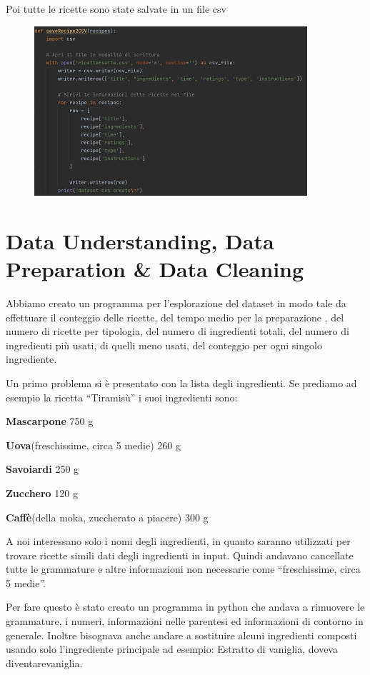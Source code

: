 \documentclass[12pt]{report}
\begin{document}
Poi tutte le ricette sono state salvate in un file csv
    \begin{figure}[H]
        \centering
        {\includegraphics[width=0.9\textwidth]{img/img3.jpg}}
    \end{figure}



\section{Data Understanding, Data Preparation \& Data Cleaning}
Abbiamo creato un programma per l’esplorazione del dataset in modo tale da effettuare il conteggio delle ricette, del tempo medio per la preparazione , del numero di ricette per tipologia, del numero di ingredienti totali, del numero di ingredienti più usati, di quelli meno usati, del conteggio per ogni singolo ingrediente. 

Un primo problema si è presentato con la lista degli ingredienti. Se prediamo ad esempio la ricetta “Tiramisù” i suoi ingredienti sono: 

\textbf{Mascarpone} 750 g

\textbf{Uova}(freschissime, circa 5 medie) 260 g

\textbf{Savoiardi} 250 g

\textbf{Zucchero} 120 g

\textbf{Caffè}(della moka, zuccherato a piacere) 300 g

A noi interessano solo i nomi degli ingredienti, in quanto saranno utilizzati per trovare ricette simili dati degli ingredienti in input. Quindi andavano cancellate tutte le grammature e altre informazioni non necessarie come “freschissime, circa 5 medie”.

Per fare questo è stato creato un programma in python che andava a rimuovere le grammature, i numeri, informazioni nelle parentesi ed informazioni di contorno in generale. Inoltre bisognava anche andare a sostituire alcuni ingredienti composti usando solo l’ingrediente principale ad esempio: Estratto di vaniglia, doveva diventarevaniglia. 
\end{document}
